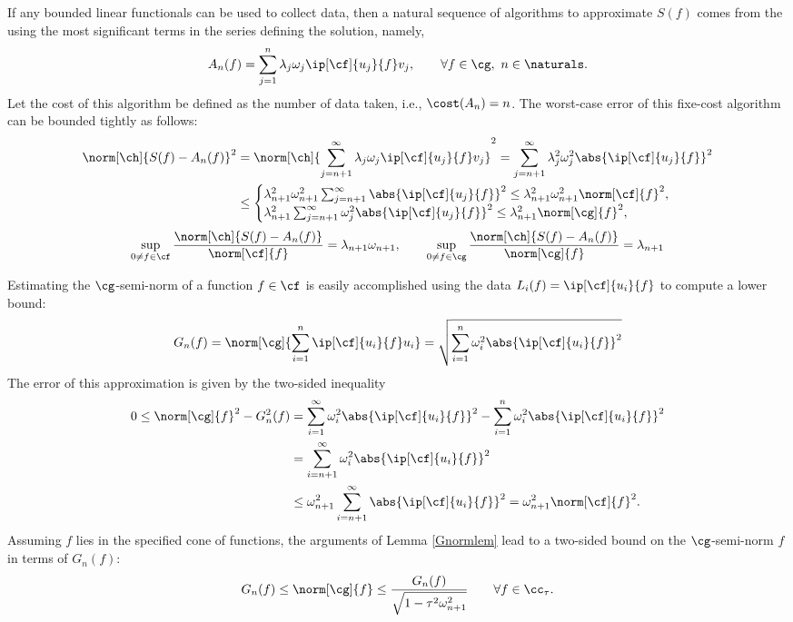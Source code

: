 \documentclass[final]{elsarticle}
\theoremstyle{definition}
\theoremstyle{remark}
\begin{document}
If any bounded linear functionals can be used to collect data, then a natural sequence of algorithms to approximate $S(f)$ comes from the using the most significant terms in the series defining the solution, namely,
\begin{equation*}
A_n(f) = \sum_{j=1}^n \lambda_j \omega_j \ip[\cf]{u_j}{f} v_j, \qquad \forall f \in \cg, \ n \in \naturals.
\end{equation*}
Let the cost of this algorithm be defined as the number of data taken, i.e., $\cost(A_n)=n$.  The worst-case error of this fixe-cost algorithm can be bounded tightly as follows:
\begin{align*}
\norm[\ch]{S(f)-A_n(f)}^2 &= \norm[\ch]{\sum_{j=n+1}^\infty \lambda_j \omega_j \ip[\cf]{u_j}{f} v_j}^2 = \sum_{j=n+1}^\infty \lambda_j^2 \omega_j^2 \abs{\ip[\cf]{u_j}{f}}^2 \\
& \le \begin{cases}
\lambda_{n+1}^2 \omega_{n+1}^2 \sum_{j=n+1}^\infty \abs{\ip[\cf]{u_j}{f}}^2 \le \lambda_{n+1}^2 \omega_{n+1}^2 \norm[\cf]{f}^2, \\
\lambda_{n+1}^2 \sum_{j=n+1}^\infty \omega_{j}^2 \abs{\ip[\cf]{u_j}{f}}^2 \le \lambda_{n+1}^2 \norm[\cg]{f}^2,
\end{cases}
\end{align*} 
\begin{equation*}
\sup_{0 \ne f \in \cf}\frac{\norm[\ch]{S(f)-A_n(f)}}{\norm[\cf]{f}} =\lambda_{n+1} \omega_{n+1}, \qquad
\sup_{0 \ne f \in \cg}\frac{\norm[\ch]{S(f)-A_n(f)}}{\norm[\cg]{f}} =\lambda_{n+1}
\end{equation*} 

Estimating the $\cg$-semi-norm of a function $f \in \cf$ is easily accomplished using the data $L_i(f)=\ip[\cf]{u_i}{f}$ to compute a lower bound:
\begin{equation} \label{genLGalg}
G_n(f) = \norm[\cg]{\sum_{i=1}^n \ip[\cf]{u_i}{f} u_i } = \sqrt{\sum_{i=1}^n \omega_i^2\abs{\ip[\cf]{u_i}{f}}^2 }
\end{equation}
The error of this approximation is given by the two-sided inequality
\begin{align*}
0 \le \norm[\cg]{f}^2 - G_n^2(f) 
&= \sum_{i=1}^\infty \omega_i^2\abs{\ip[\cf]{u_i}{f}}^2 -  \sum_{i=1}^n \omega_i^2\abs{\ip[\cf]{u_i}{f}}^2\\
& = \sum_{i=n+1}^\infty \omega_i^2\abs{\ip[\cf]{u_i}{f}}^2 \\
& \le \omega_{n+1}^2 \sum_{i=n+1}^\infty \abs{\ip[\cf]{u_i}{f}}^2 = \omega_{n+1}^2 \norm[\cf]{f}^2.
\end{align*}
Assuming $f$ lies in the specified cone of functions, the arguments of Lemma \ref{Gnormlem} lead to a two-sided bound on the $\cg$-semi-norm $f$ in terms of $G_n(f)$:
\[
G_n(f)  \le \norm[\cg]{f} \le \frac{G_n(f)}{\sqrt{1 - \tau^2 \omega_{n+1}^2}} \qquad \forall f \in \cc_{\tau}.
\]
\end{document}

